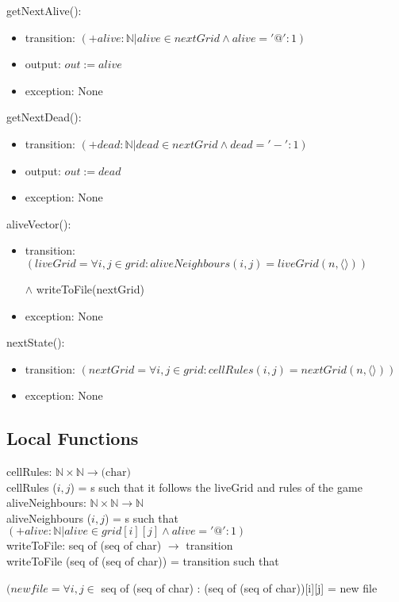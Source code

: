 \documentclass[12pt]{article}
\begin{document}
\noindent getNextAlive():
\begin{itemize}
\item transition: $(+alive : \mathbb{N} | alive \in nextGrid \land alive =  '@' : 1)$
\item output: $out := alive$
\item exception: None
\end{itemize}

\noindent getNextDead():
\begin{itemize}
\item transition: $(+dead : \mathbb{N} | dead \in nextGrid \land dead =  '-' : 1)$
\item output: $out := dead$
\item exception: None
\end{itemize}

\noindent aliveVector():
\begin{itemize}
\item transition: $(liveGrid = \forall i, j \in grid : aliveNeighbours(i, j) = liveGrid(n, \langle \rangle))$

$\land$ writeToFile(nextGrid)
\item exception: None
\end{itemize}

\noindent nextState():
\begin{itemize}
\item transition: $(nextGrid = \forall i, j \in grid : cellRules(i, j) = nextGrid(n, \langle \rangle))$
\item exception: None
\end{itemize}



\subsection*{Local Functions}

\noindent cellRules: $\mathbb{N} \times \mathbb{N} \rightarrow \mbox{(char)}$\\
\noindent cellRules ($i, j$) = s such that it follows the liveGrid and rules of the game\\

\noindent aliveNeighbours: $\mathbb{N} \times \mathbb{N} \rightarrow \mathbb{N}$\\
\noindent aliveNeighbours ($i, j$) = s such that $(+alive : \mathbb{N} | alive \in grid[i][j] \land alive =  '@' : 1)$ \\

\noindent writeToFile: seq of (seq of char) $\rightarrow$ transition\\
\noindent writeToFile (seq of (seq of char)) = transition such that 

$(new file = \forall i, j \in$ seq of (seq of char) : (seq of (seq of char))[i][j] = new file\\


\newpage
\end{document}
